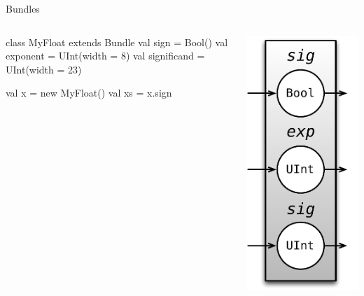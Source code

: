 \documentclass[xcolor=pdflatex,dvipsnames,table]{beamer}
\begin{document}
\begin{frame}[fragile]{Bundles}

\begin{columns}
\begin{scala}
class MyFloat extends Bundle {
  val sign        = Bool()
  val exponent    = UInt(width = 8)
  val significand = UInt(width = 23)
}

val x  = new MyFloat()
val xs = x.sign
\end{scala}


\begin{center}
\includegraphics[height=0.9\textheight]{figs/myfloat.pdf} 
\end{center}

\end{columns}
\end{frame}
\end{document}
